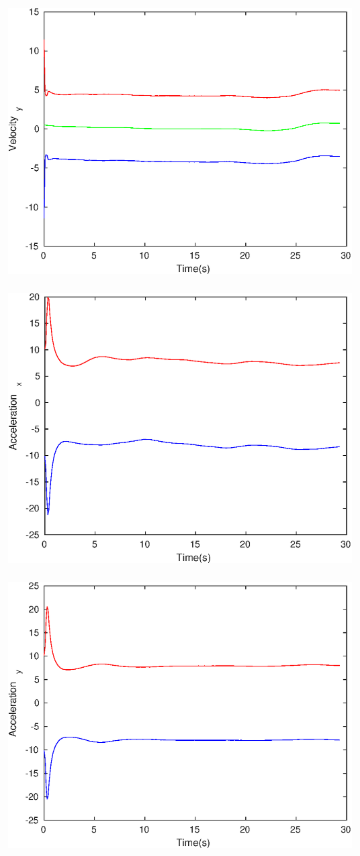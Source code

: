 \begin{figure}[!h]
\begin{subfigure}{.5\linewidth}
\end{subfigure}
\begin{subfigure}{.5\linewidth}
\centering
\includegraphics[width=.9\linewidth]{figures/Frad/s3caSMVelocity_y}
\end{subfigure}
\begin{subfigure}{.5\linewidth}
\centering
\includegraphics[width=.9\linewidth]{figures/Frad/s3caSMAcceleration_x}
\end{subfigure}
\begin{subfigure}{.5\linewidth}
\centering
\includegraphics[width=.9\linewidth]{figures/Frad/s3caSMAcceleration_y}

\end{subfigure}
\end{figure}
